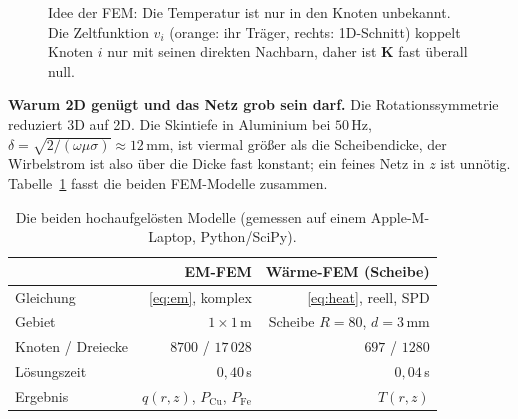 \documentclass[a4paper, 10pt, conference]{ieeeconf}
\theoremstyle{remark}
\begin{document}
\begin{figure}[t]
\centering
{}
\caption{Idee der FEM: Die Temperatur ist nur in den Knoten unbekannt.
Die Zeltfunktion $v_i$ (orange: ihr Träger, rechts: 1D-Schnitt) koppelt
Knoten $i$ nur mit seinen direkten Nachbarn, daher ist $\mathbf K$ fast
überall null.}
\label{fig:fem}
\end{figure}

\textbf{Warum 2D genügt und das Netz grob sein darf.} Die Rotationssymmetrie
reduziert 3D auf 2D. Die Skintiefe in Aluminium bei $50\,\mathrm{Hz}$,
$\delta=\sqrt{2/(\omega\mu\sigma)}\approx12\,\mathrm{mm}$, ist viermal
größer als die Scheibendicke, der Wirbelstrom ist also über die Dicke fast
konstant; ein feines Netz in $z$ ist unnötig. Tabelle~\ref{tab:fem}
fasst die beiden FEM-Modelle zusammen.

\begin{table}[t]
\centering\footnotesize
\caption{Die beiden hochaufgelösten Modelle (gemessen auf einem
Apple-M-Laptop, Python/SciPy).}
\label{tab:fem}
\begin{tabular}{@{}lrr@{}}
\toprule
 & EM-FEM & Wärme-FEM (Scheibe) \\
\midrule
Gleichung & \eqref{eq:em}, komplex & \eqref{eq:heat}, reell, SPD \\
Gebiet & $1\times1\,\mathrm m$ & Scheibe $R{=}80$, $d{=}3\,$mm \\
Knoten / Dreiecke & $8700$ / $17\,028$ & $697$ / $1280$ \\
Lösungszeit & $0{,}40\,$s & $0{,}04\,$s \\
Ergebnis & $q(r,z)$, $P_{\mathrm{Cu}}$, $P_{\mathrm{Fe}}$ & $T(r,z)$ \\
\bottomrule
\end{tabular}
\end{table}
\end{document}
